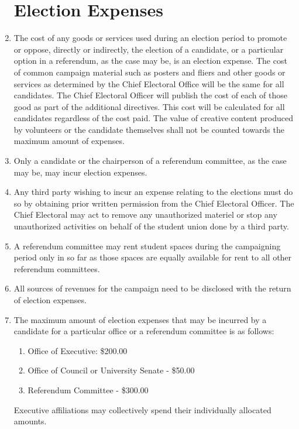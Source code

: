 \documentclass[oneside]{book}
\begin{document}
\begin{enumerate}
\section{\label{Election_Expenses}Election Expenses }
\item The cost of any goods or services used during an election period to
promote or oppose, directly or indirectly, the election of a candidate,
or a particular option in a referendum, as the case may be, is an
election expense. The cost of common campaign material such as posters
and fliers and other goods or services as determined by the Chief
Electoral Office will be the same for all candidates. The Chief Electoral
Officer will publish the cost of each of those good as part of the
additional directives. This cost will be calculated for all candidates
regardless of the cost paid. The value of creative content produced
by volunteers or the candidate themselves shall not be counted towards
the maximum amount of expenses. 
\item Only a candidate or the chairperson of a referendum committee, as
the case may be, may incur election expenses. 
\item Any third party wishing to incur an expense relating to the elections
must do so by obtaining prior written permission from the Chief Electoral
Officer. The Chief Electoral may act to remove any unauthorized materiel
or stop any unauthorized activities on behalf of the student union
done by a third party.
\item A referendum committee may rent student spaces during the campaigning period only in so far as
those spaces are equally available for rent to all other referendum committees.
\item All sources of revenues for the campaign need to be disclosed with
the return of election expenses. 
\item \label{max-election-expenses}The maximum amount of election expenses
that may be incurred by a candidate for a particular office or a referendum
committee is as follows: 

\begin{enumerate}
\item Office of Executive: \$200.00 
\item Office of Council or University Senate - \$50.00 
\item Referendum Committee - \$300.00 \\
\end{enumerate}
Executive affiliations may collectively spend their individually
allocated amounts. 


\end{enumerate}
\end{document}
